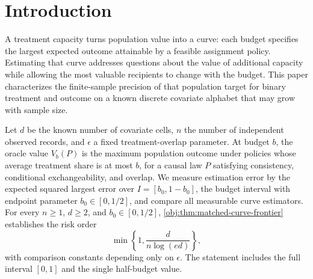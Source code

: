 \begin{abstract}
We study the population oracle-value curve indexed by treatment capacity for a binary treatment and outcome on a known discrete covariate alphabet. Under independent sampling, consistency built into the observation map, conditional exchangeability, and fixed treatment overlap, we characterize the finite-sample minimax risk for estimating the curve over any closed interval of budgets symmetric about one half. For every sample size \(n\geq1\), alphabet size \(d\geq2\), and interval endpoint \(b_0\in[0,1/2]\), the all-procedure expected squared supremum risk on \([b_0,1-b_0]\) is of order \(\min\{1,d/[n\log(ed)]\}\), with constants depending only on overlap. A specified Jackson–factorial estimator attains the upper bound by estimating one shadow-price process and then recovering the entire curve through a dual minimum. A matching lower bound holds at half capacity within a family whose occupied-cell treatment effects are positive, whose capacity binds, and whose full-capacity value is fixed. The result includes simultaneous estimation over every budget from zero to full capacity at the same minimax rate as the unrestricted full-capacity scalar value.
\end{abstract}

\section{Introduction}

A treatment capacity turns population value into a curve: each budget specifies the largest expected outcome attainable by a feasible assignment policy. Estimating that curve addresses questions about the value of additional capacity while allowing the most valuable recipients to change with the budget. This paper characterizes the finite-sample precision of that population target for binary treatment and outcome on a known discrete covariate alphabet that may grow with sample size.

Let \(d\) be the known number of covariate cells, \(n\) the number of independent observed records, and \(\epsilon\) a fixed treatment-overlap parameter. At budget \(b\), the oracle value \(V_b(P)\) is the maximum population outcome under policies whose average treatment share is at most \(b\), for a causal law \(P\) satisfying consistency, conditional exchangeability, and overlap. We measure estimation error by the expected squared largest error over \(I=[b_0,1-b_0]\), the budget interval with endpoint parameter \(b_0\in[0,1/2]\), and compare all measurable curve estimators. For every \(n\geq1\), \(d\geq2\), and \(b_0\in[0,1/2]\), \cref{obj:thm:matched-curve-frontier} establishes the risk order
\[
\min\left\{1,\frac{d}{n\log(ed)}\right\},
\]
with comparison constants depending only on \(\epsilon\). The statement includes the full interval \([0,1]\) and the single half-budget value.

